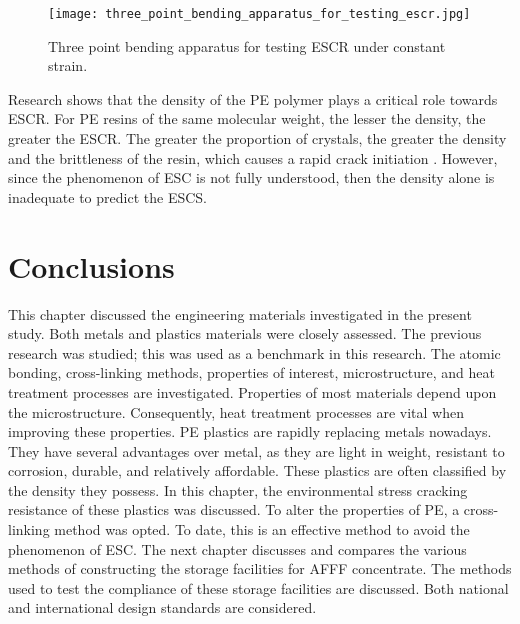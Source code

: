 \begin{figure}[H]
    \centering
    \texttt{[image: three\_point\_bending\_apparatus\_for\_testing\_escr.jpg]}
    \caption{Three point bending apparatus for testing ESCR under constant strain. \cite{choi2009modeling}}
    \label{ch3:figure:bending_apparatus}
\end{figure}

Research shows that the density of the PE polymer plays a critical role towards ESCR. For PE resins of the same molecular weight, the lesser the density, the greater the ESCR. The greater the proportion of crystals, the greater the density and the brittleness of the resin, which causes a rapid crack initiation \cite{gabriel1998history}. However, since the phenomenon of ESC is not fully understood, then the density alone is inadequate to predict the ESCS. 

\section{Conclusions}
This chapter discussed the engineering materials investigated in the present study. Both metals and plastics materials were closely assessed. The previous research was studied; this was used as a benchmark in this research. The atomic bonding, cross-linking methods, properties of interest, microstructure, and heat treatment processes are investigated. Properties of most materials depend upon the microstructure. Consequently, heat treatment processes are vital when improving these properties.
PE plastics are rapidly replacing metals nowadays. They have several advantages over metal, as they are light in weight, resistant to corrosion, durable, and relatively affordable. These plastics are often classified by the density they possess. In this chapter, the environmental stress cracking resistance of these plastics was discussed. To alter the properties of PE, a cross-linking method was opted. To date, this is an effective method to avoid the phenomenon of ESC.
The next chapter discusses and compares the various methods of constructing the storage facilities for AFFF concentrate. The methods used to test the compliance of these storage facilities are discussed. Both national and international design standards are considered.